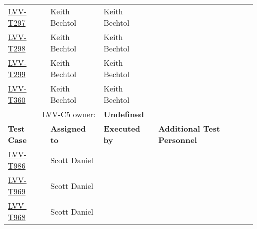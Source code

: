 \documentclass[DM,lsstdraft,STR,toc]{lsstdoc}
\begin{document}
\begin{longtable}{p{3cm}p{3cm}p{3cm}p{6cm}}
\begin{minipage}[]{6cm}
\smallskip
{\small  }
\medskip
\end{minipage}
\\ \hline
\href{https://jira.lsstcorp.org/secure/Tests.jspa#/testCase/LVV-T297}{LVV-T297}
& {\small Keith Bechtol } & {\small Keith Bechtol } &
\begin{minipage}[]{6cm}
\smallskip
{\small  }
\medskip
\end{minipage}
\\ \hline
\href{https://jira.lsstcorp.org/secure/Tests.jspa#/testCase/LVV-T298}{LVV-T298}
& {\small Keith Bechtol } & {\small Keith Bechtol } &
\begin{minipage}[]{6cm}
\smallskip
{\small  }
\medskip
\end{minipage}
\\ \hline
\href{https://jira.lsstcorp.org/secure/Tests.jspa#/testCase/LVV-T299}{LVV-T299}
& {\small Keith Bechtol } & {\small Keith Bechtol } &
\begin{minipage}[]{6cm}
\smallskip
{\small  }
\medskip
\end{minipage}
\\ \hline
\href{https://jira.lsstcorp.org/secure/Tests.jspa#/testCase/LVV-T360}{LVV-T360}
& {\small Keith Bechtol } & {\small Keith Bechtol } &
\begin{minipage}[]{6cm}
\smallskip
{\small  }
\medskip
\end{minipage}
\\ \hline
\multicolumn{2}{r}{ LVV-C5 owner:} &
\multicolumn{2}{l}{\textbf{
    Undefined
}
} \\\hline
\textbf{Test Case} & \textbf{Assigned to} & \textbf{Executed by} & \textbf{Additional Test Personnel} \\ \hline
\href{https://jira.lsstcorp.org/secure/Tests.jspa#/testCase/LVV-T986}{LVV-T986}
& {\small Scott Daniel } & {\small  } &
\begin{minipage}[]{6cm}
\smallskip
{\small  }
\medskip
\end{minipage}
\\ \hline
\href{https://jira.lsstcorp.org/secure/Tests.jspa#/testCase/LVV-T969}{LVV-T969}
& {\small Scott Daniel } & {\small  } &
\begin{minipage}[]{6cm}
\smallskip
{\small  }
\medskip
\end{minipage}
\\ \hline
\href{https://jira.lsstcorp.org/secure/Tests.jspa#/testCase/LVV-T968}{LVV-T968}
& {\small Scott Daniel } & {\small  } &
\begin{minipage}[]{6cm}
\smallskip
{\small  }

\end{minipage}
\end{longtable}
\end{document}
